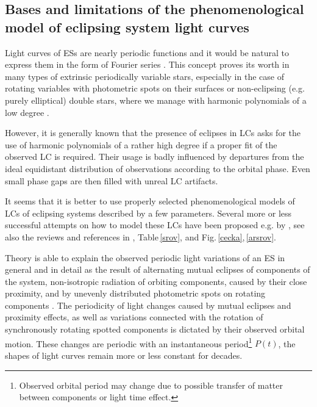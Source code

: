 \documentclass{aa}
\begin{document}
\subsection{Bases and limitations of the phenomenological model of eclipsing system light curves}\label{bases}


Light curves of ESs are nearly periodic functions and it would be natural to express them in the form of Fourier series \citep[see e.g.][]{ruc,kalmil,selam,nedor,and12}. This concept proves its worth in many types of extrinsic periodically variable stars, especially in the case of rotating variables with photometric spots on their surfaces \citep{north,mikzoo} or non-eclipsing (e.g. purely elliptical) double stars, where we manage with harmonic polynomials of a low degree \citep[e.g.][]{kalmil}.

However, it is generally known that the presence of eclipses in LCs asks for the use of harmonic polynomials of a rather high degree if a proper fit of the observed LC is required. Their usage is badly influenced by departures from the ideal equidistant distribution of observations according to the orbital phase. Even small phase gaps are then filled with unreal LC artifacts.

It seems that it is better to use properly selected phenomenological models of LCs of eclipsing systems described by a few parameters. Several more or less successful attempts on how to model these LCs have been proposed e.g. by \citet{ces71,chol}, see also the reviews and references in \citet{and12,chra}, Table\,\ref{srov}, and Fig.\,\ref{cecka},\,\ref{arsrov}.

Theory is able to explain the observed periodic light variations of an ES in general and in detail as the result of alternating mutual eclipses of components of the system, non-isotropic radiation of orbiting components, caused by their close proximity, and by unevenly distributed photometric spots on rotating components \citep[e.g.][]{BM3,hilda,pribulla}. The periodicity of light changes caused by mutual eclipses and proximity effects, as well as variations connected with the rotation of synchronously rotating spotted components is dictated by their observed orbital motion. These changes are periodic with an instantaneous period\footnote{Observed orbital period may change due to possible transfer of matter between components or light time effect.} $P(t)$, the shapes of light curves remain more or less constant for decades.
\end{document}
